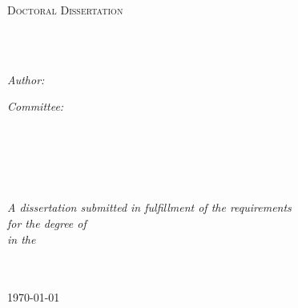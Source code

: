 \documentclass[
11pt, %
english, %
doublespacing, %
headsepline, %
]{MastersDoctoralThesis} %
\author{Zhengxing Chen} %
\begin{document}
\frontmatter %

\pagestyle{plain} %


\begin{titlepage}
\begin{center}

{\scshape\LARGE \univname\par}\vspace{0.5cm} %
\textsc{\Large Doctoral Dissertation}\\[0.5cm] %

\HRule \\[0.4cm] %
{\huge \bfseries \ttitle\par}\vspace{0.4cm} %
\HRule \\[1.5cm] %
 
\begin{minipage}[t]{0.4\textwidth}
\begin{flushleft} \large
\emph{Author:}\\
{\authorname} %
\end{flushleft}
\end{minipage}
\begin{minipage}[t]{0.4\textwidth}
\begin{flushright} \large
\emph{Committee:} \\
{\supname} \\ %
{\supnameone} \\
{\supnametwo} \\ 
{\supnamethree} 
\end{flushright}
\end{minipage}\\[3cm]
 
\vfill

\large \textit{A dissertation submitted in fulfillment of the requirements\\ for the degree of \degreename}\\[0.3cm] %
\textit{in the}\\[0.4cm]
\deptname\\\univname\\[2cm] %
 
\vfill

{\large \today}\\[4cm] %
 
\vfill
\end{center}
\end{titlepage}
\end{document}
